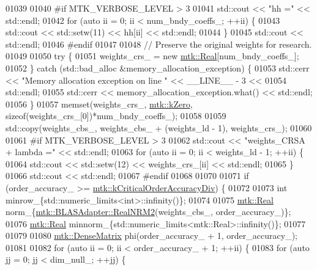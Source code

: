 \begin{DoxyCode}
{{01039 
01040 \textcolor{preprocessor}{  #if MTK\_VERBOSE\_LEVEL > 3}
01041   std::cout << \textcolor{stringliteral}{"hh ="} << std::endl;
01042   \textcolor{keywordflow}{for} (\textcolor{keyword}{auto} ii = 0; ii < num\_bndy\_coeffs\_; ++ii) \{
01043     std::cout << std::setw(11) << hh[ii] << std::endl;
01044   \}
01045   std::cout << std::endl;
01046 \textcolor{preprocessor}{  #endif}
01047 
01048   \textcolor{comment}{// Preserve the original weights for research.}
01049 
01050   \textcolor{keywordflow}{try} \{
01051     weights\_crs\_ = \textcolor{keyword}{new} \hyperlink{group__c01-roots_gac080bbbf5cbb5502c9f00405f894857d}{mtk::Real}[num\_bndy\_coeffs\_];
01052   \} \textcolor{keywordflow}{catch} (std::bad\_alloc &memory\_allocation\_exception) \{
01053     std::cerr << \textcolor{stringliteral}{"Memory allocation exception on line "} << \_\_LINE\_\_ - 3 <<
01054       std::endl;
01055     std::cerr << memory\_allocation\_exception.what() << std::endl;
01056   \}
01057   memset(weights\_crs\_, \hyperlink{group__c01-roots_ga59a451a5fae30d59649bcda274fea271}{mtk::kZero}, \textcolor{keyword}{sizeof}(weights\_crs\_[0])*num\_bndy\_coeffs\_);
01058 
01059   std::copy(weights\_cbs\_, weights\_cbs\_ + (weights\_ld - 1), weights\_crs\_);
01060 
01061 \textcolor{preprocessor}{  #if MTK\_VERBOSE\_LEVEL > 3}
01062   std::cout << \textcolor{stringliteral}{"weights\_CRSA + lambda ="} << std::endl;
01063   \textcolor{keywordflow}{for} (\textcolor{keyword}{auto} ii = 0; ii < weights\_ld - 1; ++ii) \{
01064     std::cout << std::setw(12) << weights\_crs\_[ii] << std::endl;
01065   \}
01066   std::cout << std::endl;
01067 \textcolor{preprocessor}{  #endif}
01068 
01070 
01071   \textcolor{keywordflow}{if} (order\_accuracy\_ >= \hyperlink{group__c01-roots_ga0898eef2108473e44a5223932d571c31}{mtk::kCriticalOrderAccuracyDiv}) \{
01072 
01073     \textcolor{keywordtype}{int} minrow\_\{std::numeric\_limits<int>::infinity()\};
01074 
01075     \hyperlink{group__c01-roots_gac080bbbf5cbb5502c9f00405f894857d}{mtk::Real} norm\_\{\hyperlink{classmtk_1_1BLASAdapter_ab92440888b730863244c5d9479c11aca}{mtk::BLASAdapter::RealNRM2}(weights\_cbs\_,
      order\_accuracy\_)\};
01076     \hyperlink{group__c01-roots_gac080bbbf5cbb5502c9f00405f894857d}{mtk::Real} minnorm\_\{std::numeric\_limits<mtk::Real>::infinity()\};
01077 
01079 
01080     \hyperlink{classmtk_1_1DenseMatrix}{mtk::DenseMatrix} phi(order\_accuracy\_ + 1, order\_accuracy\_);
01081 
01082     \textcolor{keywordflow}{for} (\textcolor{keyword}{auto} ii = 0; ii < order\_accuracy\_ + 1; ++ii) \{
01083       \textcolor{keywordflow}{for} (\textcolor{keyword}{auto} jj = 0; jj < dim\_null\_; ++jj) \{
}}
\end{DoxyCode}
